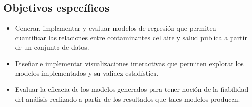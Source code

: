 \subsection{Objetivos específicos}
\begin{itemize}
\item Generar, implementar y evaluar modelos de regresión que permiten cuantificar las relaciones entre contaminantes del aire y salud pública a partir de un conjunto de datos.
\end{itemize}
\begin{itemize}
\item Diseñar e implementar visualizaciones interactivas que permiten explorar los modelos implementados y su validez estadística.
\end{itemize}
\begin{itemize}
\item Evaluar la eficacia de los modelos generados para tener noción de la fiabilidad del análisis realizado a partir de los resultados que tales modelos producen.
\end{itemize}

